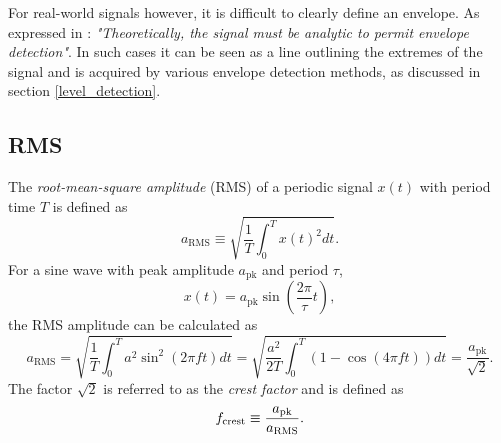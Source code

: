 \documentclass[../main2.tex]{subfiles}
\begin{document}
For real-world signals however, it is difficult to clearly define an envelope. As expressed in \cite{bedrosian1962analytic}: \emph{"Theoretically, the signal must be analytic to permit envelope detection"}. In such cases it can be seen as a line outlining the extremes of the signal and is acquired by various envelope detection methods, as discussed in section \ref{level_detection}. 
\subsection{RMS}
The \emph{root-mean-square amplitude} (RMS) of a periodic signal $x(t)$ with period time $T$ is defined as
\begin{equation}
a_\text{RMS} \equiv \sqrt{ \frac{1}{T} \int_{0}^{T} x(t)^2 dt }.
\end{equation}
For a sine wave with peak amplitude $a_\text{pk}$ and period $\tau$,
\begin{equation}\label{eq:sine_wave}
x(t) = a_\text{pk} \sin \left( \frac{2 \pi}{\tau}t \right), 
\end{equation}
the RMS amplitude can be calculated as
\begin{equation}\label{eq:a_RMS}
a_\text{RMS} =
\sqrt{ \frac{1}{T} \int_{0}^{T} a^2 \sin^2 (2 \pi f t) dt } =
\sqrt{ \frac{a^2}{2T} \int_{0}^{T}\left( 1 - \cos (4 \pi f t) \right) dt } =
\frac{a_\text{pk}}{\sqrt 2}.
\end{equation}
The factor $\sqrt 2$ is referred to as the \emph{crest factor} and is defined as
\begin{align}
f_\text{crest} \equiv \frac{a_\text{pk}}{a_\text{RMS}}. \label{eq:crest_factor}
\end{align}
\end{document}
